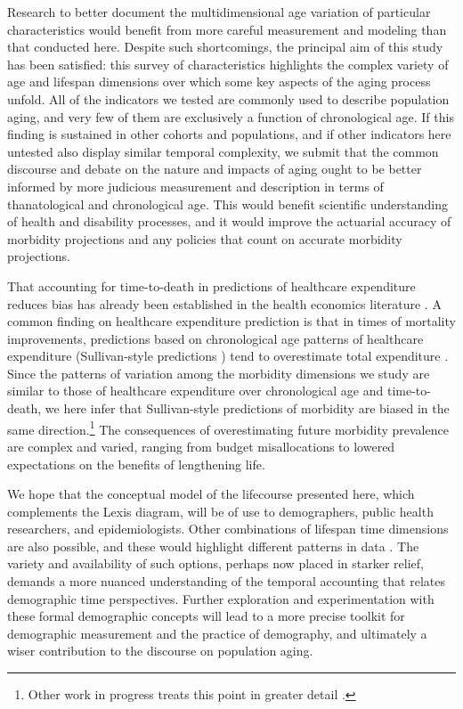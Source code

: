 \documentclass[11pt,oneside]{article} %
\begin{document}
Research to better document the multidimensional age variation of particular
characteristics would benefit from more careful measurement and modeling than
that conducted here. Despite such shortcomings, the principal aim of this study
has been satisfied: this survey of characteristics highlights the complex
variety of age and lifespan dimensions over which some key aspects of the aging process unfold. All
of the indicators we tested are commonly used to describe population aging, and
very few of them are exclusively a function of chronological age. If this
finding is sustained in other cohorts and populations, and if other indicators
here untested also display similar temporal complexity, we submit that the
common discourse and debate on the nature and impacts of aging ought to be
better informed by more judicious measurement and description in terms of
thanatological and chronological age. This would benefit scientific
understanding of health and disability processes, and it would improve
the actuarial accuracy of morbidity projections and any policies that count
on accurate morbidity projections. 

That accounting for time-to-death in predictions of
healthcare expenditure reduces bias has already been established in the health
economics literature \citep[e.g.,][]{stearns2004time}. A common finding
on healthcare expenditure prediction is that in times of mortality improvements,
predictions based on chronological age patterns of healthcare
expenditure (Sullivan-style predictions \citep{sullivan1970}) tend
to overestimate total expenditure \citep[e.g.,][]{geue2014population}. 
Since the patterns of variation among the morbidity dimensions we study are
similar to those of healthcare expenditure over chronological age and
time-to-death, we here infer that Sullivan-style predictions of morbidity are
biased in the same direction.\footnote{Other work in progress treats this point
in greater detail \citep{vanRaalte2015HLE}.} The consequences of overestimating
future morbidity prevalence are complex and varied, ranging from
budget misallocations to lowered expectations on the benefits of lengthening
life.

We hope that the conceptual model of the
lifecourse presented here, which complements the Lexis diagram, will be of use
to demographers, public health researchers, and epidemiologists. Other combinations
of lifespan time dimensions are also possible, and these would highlight
different patterns in data \citep{rsv2015}. The variety and availability of such
options, perhaps now placed in starker relief, demands a more nuanced understanding of the temporal accounting that relates demographic time
perspectives. Further exploration and experimentation with these formal
demographic concepts will lead to a more precise toolkit for demographic
measurement and the practice of demography, and ultimately a wiser contribution
to the discourse on population aging.
\end{document}
